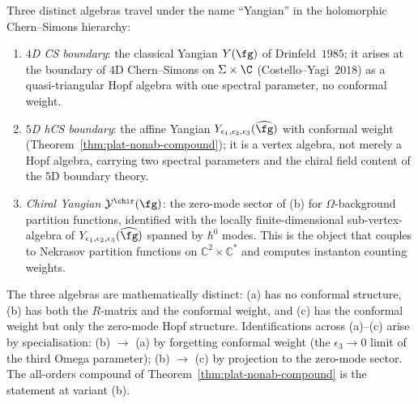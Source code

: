 \begin{remark}
\label{rmk:plat-chiral-yangian}
Three distinct algebras travel under the name ``Yangian'' in the
holomorphic Chern--Simons hierarchy:
\begin{enumerate}[label=\textup{(\alph*)}]
\item \emph{$4$D CS boundary}: the classical Yangian $Y(\fg)$ of
Drinfeld~$1985$; it arises at the boundary of $4$D Chern--Simons on
$\Sigma \times \C$ (Costello--Yagi~$2018$) as a quasi-triangular Hopf
algebra with one spectral parameter, no conformal weight.
\item \emph{$5$D hCS boundary}: the affine Yangian
$Y_{\epsilon_1,\epsilon_2,\epsilon_3}(\widehat\fg)$ with conformal
weight (Theorem~\ref{thm:plat-nonab-compound}); it is a vertex
algebra, not merely a Hopf algebra, carrying two spectral parameters
and the chiral field content of the $5$D boundary theory.
\item \emph{Chiral Yangian $\mathcal{Y}^{\chir}(\fg)$}: the zero-mode
sector of (b) for $\Omega$-background partition functions, identified
with the locally finite-dimensional sub-vertex-algebra of
$Y_{\epsilon_1,\epsilon_2,\epsilon_3}(\widehat\fg)$ spanned by
$\hbar^0$ modes. This is the object that couples to Nekrasov
partition functions on $\mathbb{C}^2 \times \mathbb{C}^*$ and computes
instanton counting weights.
\end{enumerate}
The three algebras are mathematically distinct: (a) has no conformal
structure, (b) has both the $R$-matrix and the conformal weight,
and (c) has the conformal weight but only the zero-mode Hopf
structure. Identifications across (a)--(c) arise by specialisation:
(b) $\to$ (a) by forgetting conformal weight (the $\epsilon_3 \to 0$
limit of the third Omega parameter); (b) $\to$ (c) by projection to
the zero-mode sector. The all-orders compound of
Theorem~\ref{thm:plat-nonab-compound} is the statement at variant
(b).
\end{remark}
